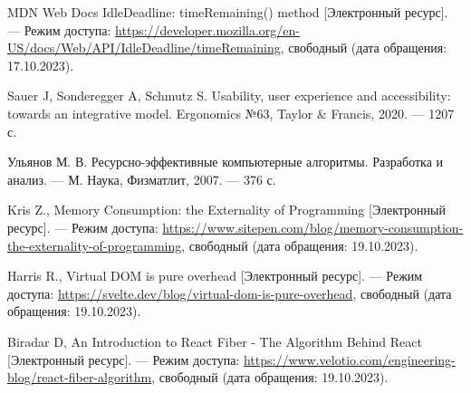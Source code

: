 \begin{thebibliography}{}
	MDN Web Docs IdleDeadline: timeRemaining() method [Электронный ресурс]. --- Режим доступа: \url{https://developer.mozilla.org/en-US/docs/Web/API/IdleDeadline/timeRemaining}, свободный (дата обращения: 17.10.2023).

	Sauer J, Sonderegger A, Schmutz S. Usability, user experience and accessibility: towards an integrative model. Ergonomics №63, Taylor \& Francis, 2020. --- 1207 с.

	Ульянов М. В. Ресурсно-эффективные компьютерные алгоритмы. Разработка и анализ. --- М. Наука, Физматлит, 2007. --- 376 с.

	Kris Z., Memory Consumption: the Externality of Programming [Электронный ресурс]. --- Режим доступа: \url{https://www.sitepen.com/blog/memory-consumption-the-externality-of-programming}, свободный (дата обращения: 19.10.2023).

	Harris R., Virtual DOM is pure overhead [Электронный ресурс]. --- Режим доступа: \url{https://svelte.dev/blog/virtual-dom-is-pure-overhead}, свободный (дата обращения: 19.10.2023).


	Biradar D, An Introduction to React Fiber - The Algorithm Behind React [Электронный ресурс]. --- Режим доступа: \url{https://www.velotio.com/engineering-blog/react-fiber-algorithm}, свободный (дата обращения: 19.10.2023).
\end{thebibliography}
\endgroup

\pagebreak